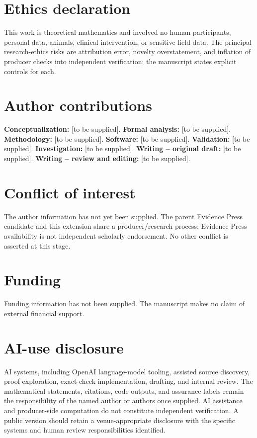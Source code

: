 \documentclass[
  11pt,
  a4paper,
]{article}
\begin{document}
\section{Ethics declaration}\label{ethics-declaration}

This work is theoretical mathematics and involved no human participants,
personal data, animals, clinical intervention, or sensitive field data.
The principal research-ethics risks are attribution error, novelty
overstatement, and inflation of producer checks into independent
verification; the manuscript states explicit controls for each.

\section{Author contributions}\label{author-contributions}

\textbf{Conceptualization:} {[}to be supplied{]}. \textbf{Formal
analysis:} {[}to be supplied{]}. \textbf{Methodology:} {[}to be
supplied{]}. \textbf{Software:} {[}to be supplied{]}.
\textbf{Validation:} {[}to be supplied{]}. \textbf{Investigation:} {[}to
be supplied{]}. \textbf{Writing -- original draft:} {[}to be
supplied{]}. \textbf{Writing -- review and editing:} {[}to be
supplied{]}.

\section{Conflict of interest}\label{conflict-of-interest}

The author information has not yet been supplied. The parent Evidence
Press candidate and this extension share a producer/research process;
Evidence Press availability is not independent scholarly endorsement. No
other conflict is asserted at this stage.

\section{Funding}\label{funding}

Funding information has not been supplied. The manuscript makes no claim
of external financial support.

\section{AI-use disclosure}\label{ai-use-disclosure}

AI systems, including OpenAI language-model tooling, assisted source
discovery, proof exploration, exact-check implementation, drafting, and
internal review. The mathematical statements, citations, code outputs,
and assurance labels remain the responsibility of the named author or
authors once supplied. AI assistance and producer-side computation do
not constitute independent verification. A public version should retain
a venue-appropriate disclosure with the specific systems and human
review responsibilities identified.
\end{document}
